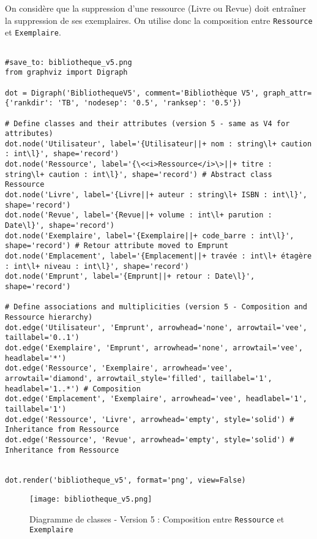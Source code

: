 \documentclass{article}
\begin{document}
On considère que la suppression d'une ressource (Livre ou Revue) doit entraîner la suppression de ses exemplaires. On utilise donc la composition entre \texttt{Ressource} et \texttt{Exemplaire}.

\begin{verbatim}

#save_to: bibliotheque_v5.png
from graphviz import Digraph

dot = Digraph('BibliothequeV5', comment='Bibliothèque V5', graph_attr={'rankdir': 'TB', 'nodesep': '0.5', 'ranksep': '0.5'})

# Define classes and their attributes (version 5 - same as V4 for attributes)
dot.node('Utilisateur', label='{Utilisateur||+ nom : string\l+ caution : int\l}', shape='record')
dot.node('Ressource', label='{\<<i>Ressource</i>\>||+ titre : string\l+ caution : int\l}', shape='record') # Abstract class Ressource
dot.node('Livre', label='{Livre||+ auteur : string\l+ ISBN : int\l}', shape='record')
dot.node('Revue', label='{Revue||+ volume : int\l+ parution : Date\l}', shape='record')
dot.node('Exemplaire', label='{Exemplaire||+ code_barre : int\l}', shape='record') # Retour attribute moved to Emprunt
dot.node('Emplacement', label='{Emplacement||+ travée : int\l+ étagère : int\l+ niveau : int\l}', shape='record')
dot.node('Emprunt', label='{Emprunt||+ retour : Date\l}', shape='record')

# Define associations and multiplicities (version 5 - Composition and Ressource hierarchy)
dot.edge('Utilisateur', 'Emprunt', arrowhead='none', arrowtail='vee', taillabel='0..1')
dot.edge('Exemplaire', 'Emprunt', arrowhead='none', arrowtail='vee', headlabel='*')
dot.edge('Ressource', 'Exemplaire', arrowhead='vee', arrowtail='diamond', arrowtail_style='filled', taillabel='1', headlabel='1..*') # Composition
dot.edge('Emplacement', 'Exemplaire', arrowhead='vee', headlabel='1', taillabel='1')
dot.edge('Ressource', 'Livre', arrowhead='empty', style='solid') # Inheritance from Ressource
dot.edge('Ressource', 'Revue', arrowhead='empty', style='solid') # Inheritance from Ressource


dot.render('bibliotheque_v5', format='png', view=False)
\end{verbatim}

\begin{figure}[H]
    \centering
    \texttt{[image: bibliotheque\_v5.png]}
    \caption{Diagramme de classes - Version 5 : Composition entre \texttt{Ressource} et \texttt{Exemplaire}}
    \label{fig:bibliotheque_v5}
\end{figure}
\end{document}
